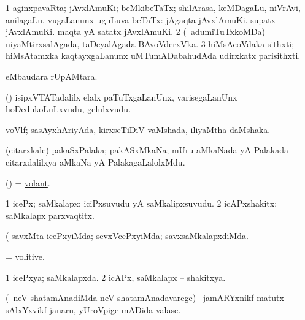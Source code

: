 \bentry 
{} 
\gl{\nA}
\bmng
\bnum
\num{1} aginxpavaRta; jAvxlAmuKi; beMkibeTaTx; shilArasa, keMDagaLu, niVrAvi, anilagaLu, \mo vugaLanunx uguLuva beTaTx:  jAgaqta jAvxlAmuKi.  supatx jAvxlAmuKi.  maqta yA satatx jAvxlAmuKi. 
\num{2} (\kanmu\ adumiTuTxkoMDa) niyaMtirxsalAgada, taDeyalAgada BAvoVderxVka. 
\num{3} hiMsAcoVdaka sithxti; hiMsAtamxka kaqtayxgaLanunx uMTumADabahudAda udirxkatx parisithxti. 
\enum
\emng
\eentry

\bentry
{} 
\gl{\nA}
\expl{}
\bmng
  eMbaudara rUpAMtara. 
\emng
\eentry

\bentry 
{} 
\gl{\nA}
\expl{}
\bmng
 (\pArxparx) isipxVTATadalilx elalx paTuTxgaLanUnx, varisegaLanUnx hoDedukoLuLxvudu, gelulxvudu. 
\emng
\eentry

\bentry 
{} 
\gl{\nA}
\expl{}
\bmng
 voVlf; sasAyxhAriyAda, kirxseTiDiV vaMshada, iliyaMtha daMshaka.  
\emng
\eentry

\bentry
{} 
\gl{\nA}
\expl{}
\bmng
 (citarxkale) pakaSxPalaka; pakASxMkaNa; mUru aMkaNada yA Palakada citarxdalilxya aMkaNa yA PalakagaLalolxMdu. 
\emng
\eentry

\bentry 
{} 
\gl{\gu}
\expl{}
\bmng
 (\pArxvi) = \hyperlink{volant}{volant}. 
\emng
\eentry

\bentry
{} 
\gl{\nA}
\expl{}
\bmng
\bnum
\num{1} icePx; saMkalapx; iciPxsuvudu yA saMkalipxsuvudu. 
\num{2} icAPxshakitx; saMkalapx parxvaqtitx. 
\enum
\emng

\noindent 
\gl{\pagu}
\expl{}
\bmng
  (  savxMta icePxyiMda; sevxVcePxyiMda; savxsaMkalapxdiMda. 
\emng
\eentry

\bentry
{} 
\gl{\gu}
\expl{}
\bmng
 = \hyperlink{volitive}{volitive}. 
\emng
\eentry

\bentry 
{} 
\gl{\gu}
\expl{}
\bmng
\bnum
\num{1} icePxya; saMkalapxda. 
\num{2} icAPx, saMkalapx -- shakitxya. 
\enum
\emng
\eentry

\bentry 
{} 
\gl{\nA}
\expl{\G}
\bmng
(\kirxsha\ neV shatamAnadiMda neV shatamAnadavarege) \kanmu\ jamARYxnikf matutx sAlxYxvikf janaru, yUroVpige mADida valase. 
\emng
\eentry

